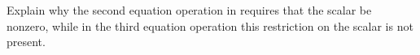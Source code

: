 Explain why the second equation operation in  requires that the scalar be nonzero, while in the third equation operation this restriction on the scalar is not present.